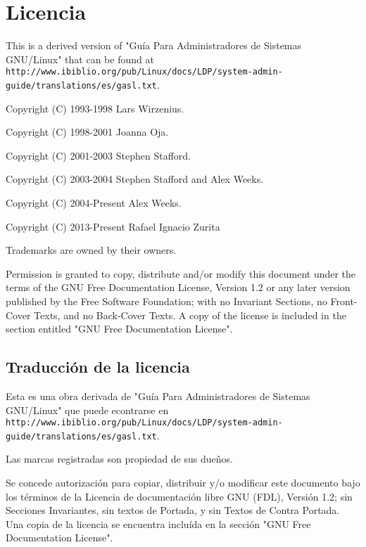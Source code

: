 \section*{Licencia}
This is a derived version of "Guía Para Administradores de Sistemas GNU/Linux" that 
can be found at \\ \texttt{http://www.ibiblio.org/pub/Linux/docs/LDP/system-admin-guide/translations/es/gasl.txt}.

Copyright (C) 1993-1998 Lars Wirzenius.

Copyright (C) 1998-2001 Joanna Oja.

Copyright (C) 2001-2003 Stephen Stafford.

Copyright (C) 2003-2004 Stephen Stafford and Alex Weeks.

Copyright (C) 2004-Present Alex Weeks.

Copyright (C) 2013-Present Rafael Ignacio Zurita

Trademarks are owned by their owners.

Permission is granted to copy, distribute and/or modify this document under
the terms of the GNU Free Documentation License, Version 1.2 or any later
version published by the Free Software Foundation; with no Invariant
Sections, no Front-Cover Texts, and no Back-Cover Texts. A copy of the
license is included in the section entitled "GNU Free Documentation License".

\subsection*{Traducción de la licencia}
Esta es una obra derivada de "Guía Para Administradores de Sistemas GNU/Linux" que puede 
econtrarse en \\ \texttt{http://www.ibiblio.org/pub/Linux/docs/LDP/system-admin-guide/translations/es/gasl.txt}.

Las marcas registradas son propiedad de sus dueños.

Se concede autorización para copiar, distribuir y/o modificar este documento
bajo los términos de la Licencia de documentación libre GNU (FDL), Versión 1.2; 
sin Secciones Invariantes, sin textos de Portada, y sin Textos de Contra Portada. 
Una copia de la licencia se encuentra incluída en la sección "GNU Free Documentation License".
